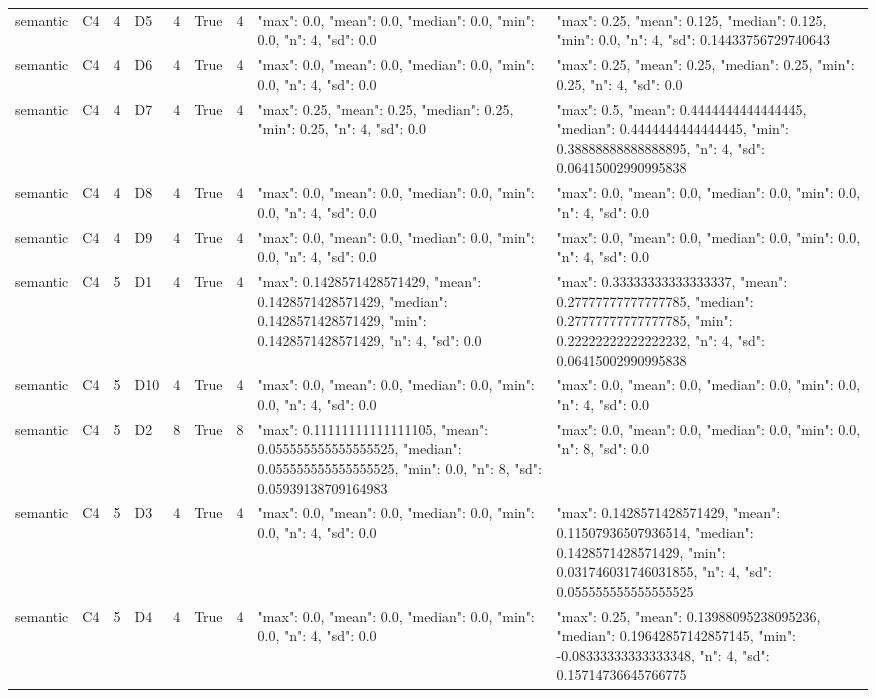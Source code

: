\begin{tabular}{lllllllll}
semantic & C4 & 4 & D5 & 4 & True & 4 & {"max": 0.0, "mean": 0.0, "median": 0.0, "min": 0.0, "n": 4, "sd": 0.0} & {"max": 0.25, "mean": 0.125, "median": 0.125, "min": 0.0, "n": 4, "sd": 0.14433756729740643} \\
semantic & C4 & 4 & D6 & 4 & True & 4 & {"max": 0.0, "mean": 0.0, "median": 0.0, "min": 0.0, "n": 4, "sd": 0.0} & {"max": 0.25, "mean": 0.25, "median": 0.25, "min": 0.25, "n": 4, "sd": 0.0} \\
semantic & C4 & 4 & D7 & 4 & True & 4 & {"max": 0.25, "mean": 0.25, "median": 0.25, "min": 0.25, "n": 4, "sd": 0.0} & {"max": 0.5, "mean": 0.4444444444444445, "median": 0.4444444444444445, "min": 0.38888888888888895, "n": 4, "sd": 0.06415002990995838} \\
semantic & C4 & 4 & D8 & 4 & True & 4 & {"max": 0.0, "mean": 0.0, "median": 0.0, "min": 0.0, "n": 4, "sd": 0.0} & {"max": 0.0, "mean": 0.0, "median": 0.0, "min": 0.0, "n": 4, "sd": 0.0} \\
semantic & C4 & 4 & D9 & 4 & True & 4 & {"max": 0.0, "mean": 0.0, "median": 0.0, "min": 0.0, "n": 4, "sd": 0.0} & {"max": 0.0, "mean": 0.0, "median": 0.0, "min": 0.0, "n": 4, "sd": 0.0} \\
semantic & C4 & 5 & D1 & 4 & True & 4 & {"max": 0.1428571428571429, "mean": 0.1428571428571429, "median": 0.1428571428571429, "min": 0.1428571428571429, "n": 4, "sd": 0.0} & {"max": 0.33333333333333337, "mean": 0.27777777777777785, "median": 0.27777777777777785, "min": 0.22222222222222232, "n": 4, "sd": 0.06415002990995838} \\
semantic & C4 & 5 & D10 & 4 & True & 4 & {"max": 0.0, "mean": 0.0, "median": 0.0, "min": 0.0, "n": 4, "sd": 0.0} & {"max": 0.0, "mean": 0.0, "median": 0.0, "min": 0.0, "n": 4, "sd": 0.0} \\
semantic & C4 & 5 & D2 & 8 & True & 8 & {"max": 0.11111111111111105, "mean": 0.055555555555555525, "median": 0.055555555555555525, "min": 0.0, "n": 8, "sd": 0.05939138709164983} & {"max": 0.0, "mean": 0.0, "median": 0.0, "min": 0.0, "n": 8, "sd": 0.0} \\
semantic & C4 & 5 & D3 & 4 & True & 4 & {"max": 0.0, "mean": 0.0, "median": 0.0, "min": 0.0, "n": 4, "sd": 0.0} & {"max": 0.1428571428571429, "mean": 0.11507936507936514, "median": 0.1428571428571429, "min": 0.031746031746031855, "n": 4, "sd": 0.055555555555555525} \\
semantic & C4 & 5 & D4 & 4 & True & 4 & {"max": 0.0, "mean": 0.0, "median": 0.0, "min": 0.0, "n": 4, "sd": 0.0} & {"max": 0.25, "mean": 0.13988095238095236, "median": 0.19642857142857145, "min": -0.08333333333333348, "n": 4, "sd": 0.15714736645766775} \\

\end{tabular}
